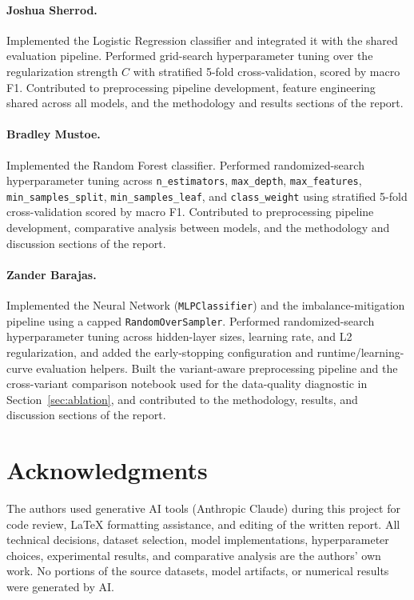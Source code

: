 \documentclass[11pt]{article}
\begin{document}
\paragraph{Joshua Sherrod.}
Implemented the Logistic Regression classifier and integrated it with the
shared evaluation pipeline. Performed grid-search hyperparameter tuning over
the regularization strength $C$ with stratified 5-fold cross-validation,
scored by macro F1. Contributed to preprocessing pipeline development,
feature engineering shared across all models, and the methodology and
results sections of the report.

\paragraph{Bradley Mustoe.}
Implemented the Random Forest classifier. Performed randomized-search
hyperparameter tuning across \texttt{n\_estimators}, \texttt{max\_depth},
\texttt{max\_features}, \texttt{min\_samples\_split},
\texttt{min\_samples\_leaf}, and \texttt{class\_weight} using stratified
5-fold cross-validation scored by macro F1. Contributed to preprocessing
pipeline development, comparative analysis between models, and the
methodology and discussion sections of the report.

\paragraph{Zander Barajas.}
Implemented the Neural Network (\texttt{MLPClassifier}) and the
imbalance-mitigation pipeline using a capped \texttt{RandomOverSampler}.
Performed randomized-search hyperparameter tuning across hidden-layer sizes,
learning rate, and L2 regularization, and added the early-stopping
configuration and runtime/learning-curve evaluation helpers. Built the
variant-aware preprocessing pipeline and the cross-variant comparison
notebook used for the data-quality diagnostic in
Section~\ref{sec:ablation}, and contributed to the methodology, results,
and discussion sections of the report.

\section*{Acknowledgments}

The authors used generative AI tools (Anthropic Claude) during this project
for code review, LaTeX formatting assistance, and editing of the written
report. All technical decisions, dataset selection, model implementations,
hyperparameter choices, experimental results, and comparative analysis are
the authors' own work. No portions of the source datasets, model
artifacts, or numerical results were generated by AI.
\end{document}
